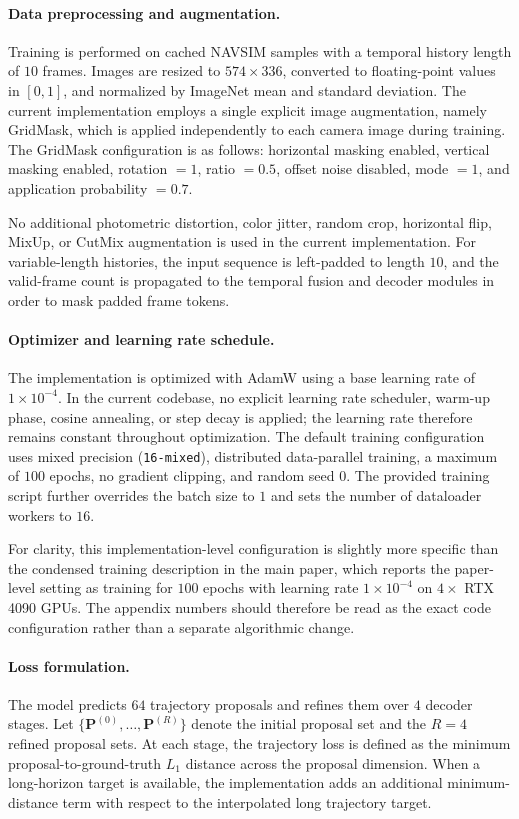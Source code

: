 \paragraph{Data preprocessing and augmentation.}
Training is performed on cached NAVSIM samples with a temporal history length of $10$ frames. Images are resized to $574 \times 336$, converted to floating-point values in $[0,1]$, and normalized by ImageNet mean and standard deviation. The current implementation employs a single explicit image augmentation, namely GridMask, which is applied independently to each camera image during training. The GridMask configuration is as follows: horizontal masking enabled, vertical masking enabled, rotation $=1$, ratio $=0.5$, offset noise disabled, mode $=1$, and application probability $=0.7$.

No additional photometric distortion, color jitter, random crop, horizontal flip, MixUp, or CutMix augmentation is used in the current implementation. For variable-length histories, the input sequence is left-padded to length $10$, and the valid-frame count is propagated to the temporal fusion and decoder modules in order to mask padded frame tokens.

\paragraph{Optimizer and learning rate schedule.}
The implementation is optimized with AdamW using a base learning rate of $1 \times 10^{-4}$. In the current codebase, no explicit learning rate scheduler, warm-up phase, cosine annealing, or step decay is applied; the learning rate therefore remains constant throughout optimization. The default training configuration uses mixed precision (\texttt{16-mixed}), distributed data-parallel training, a maximum of $100$ epochs, no gradient clipping, and random seed $0$. The provided training script further overrides the batch size to $1$ and sets the number of dataloader workers to $16$.

For clarity, this implementation-level configuration is slightly more specific than the condensed training description in the main paper, which reports the paper-level setting as training for $100$ epochs with learning rate $1 \times 10^{-4}$ on $4\times$ RTX 4090 GPUs. The appendix numbers should therefore be read as the exact code configuration rather than a separate algorithmic change.

\paragraph{Loss formulation.}
The model predicts $64$ trajectory proposals and refines them over $4$ decoder stages. Let $\{\mathbf{P}^{(0)}, \dots, \mathbf{P}^{(R)}\}$ denote the initial proposal set and the $R=4$ refined proposal sets. At each stage, the trajectory loss is defined as the minimum proposal-to-ground-truth $L_1$ distance across the proposal dimension. When a long-horizon target is available, the implementation adds an additional minimum-distance term with respect to the interpolated long trajectory target.

